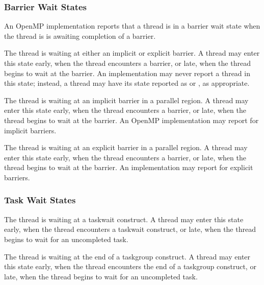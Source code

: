 \subsubsection{Barrier Wait States}

An OpenMP implementation reports that a thread is in a barrier wait state 
when the thread is is awaiting completion of a barrier.


\begin{description}

  \item {} 
  
  \sloppy
  The thread is waiting at either an implicit or explicit barrier.
  A thread may enter this state
  early, when the thread encounters a barrier, or late, when the
  thread begins to wait at the barrier. An implementation may never report a thread in this state; instead, a thread may have its state reported
  as   or , as appropriate.
  
  \item {} 
  
  \sloppy
  The thread is waiting at an implicit barrier in a parallel region. 
  A  thread may enter this state
  early, when the thread encounters a barrier, or late, when the
  thread begins to wait at the barrier.
  An OpenMP implementation may report  
  for implicit barriers.
  
  \item {} 

  The thread is waiting at an explicit barrier  in a parallel region. 
  A thread may enter this state
  early, when the thread encounters a barrier, or late, when the
  thread begins to wait at the barrier.
  An implementation may report  
  for explicit barriers.
  
\end{description}
  
\subsubsection{Task Wait States}

\begin{description}

\item {} 

  The thread is waiting at a taskwait construct. A 
  thread may enter this state early, when the
  thread encounters a taskwait construct, or late, when the thread
  begins to wait for an uncompleted task.

\item {} 

  The thread is waiting at the end of a taskgroup construct. A 
  thread may enter this state early, when the
  thread encounters the end of a taskgroup construct, or late, when the thread
  begins to wait for an uncompleted task.

\end{description}


